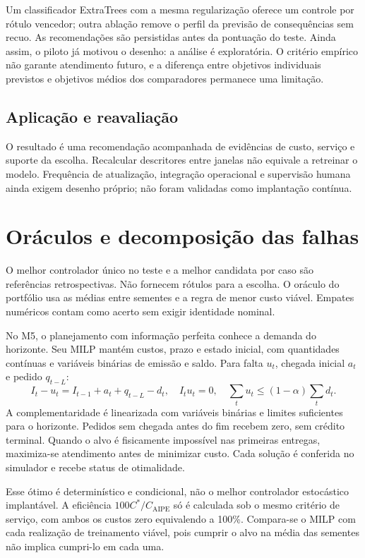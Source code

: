 Um classificador ExtraTrees com a mesma regularização oferece um controle por rótulo vencedor; outra ablação remove o perfil da previsão de consequências sem recuo. As recomendações são persistidas antes da pontuação do teste. Ainda assim, o piloto já motivou o desenho: a análise é exploratória. O critério empírico não garante atendimento futuro, e a diferença entre objetivos individuais previstos e objetivos médios dos comparadores permanece uma limitação.

\subsection{Aplicação e reavaliação}
\label{sec:aplicacao_aipe}
O resultado é uma recomendação acompanhada de evidências de custo, serviço e suporte da escolha. Recalcular descritores entre janelas não equivale a retreinar o modelo. Frequência de atualização, integração operacional e supervisão humana ainda exigem desenho próprio; não foram validadas como implantação contínua.

\section{Oráculos e decomposição das falhas}
O melhor controlador único no teste e a melhor candidata por caso são referências retrospectivas. Não fornecem rótulos para a escolha. O oráculo do portfólio usa as médias entre sementes e a regra de menor custo viável. Empates numéricos contam como acerto sem exigir identidade nominal.

No M5, o planejamento com informação perfeita conhece a demanda do horizonte. Seu MILP mantém custos, prazo e estado inicial, com quantidades contínuas e variáveis binárias de emissão e saldo. Para falta $u_t$, chegada inicial $a_t$ e pedido $q_{t-L}$:
\[
 I_t-u_t=I_{t-1}+a_t+q_{t-L}-d_t,\quad
 I_tu_t=0,\quad \sum_tu_t\leq(1-\alpha)\sum_td_t.
\]
A complementaridade é linearizada com variáveis binárias e limites suficientes para o horizonte. Pedidos sem chegada antes do fim recebem zero, sem crédito terminal. Quando o alvo é fisicamente impossível nas primeiras entregas, maximiza-se atendimento antes de minimizar custo. Cada solução é conferida no simulador e recebe status de otimalidade.

Esse ótimo é determinístico e condicional, não o melhor controlador estocástico implantável. A eficiência $100C^*/C_{\mathrm{AIPE}}$ só é calculada sob o mesmo critério de serviço, com ambos os custos zero equivalendo a 100\%. Compara-se o MILP com cada realização de treinamento viável, pois cumprir o alvo na média das sementes não implica cumpri-lo em cada uma.

